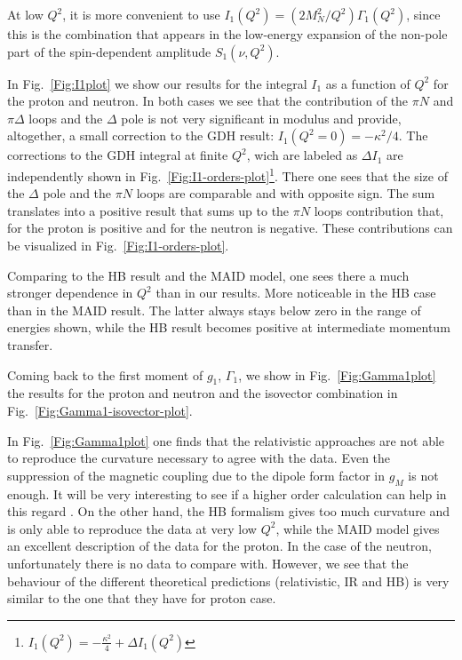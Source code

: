 \documentclass[prc,twocolumn,showpacs,preprintnumbers,amsmath,amssymb
,superscriptaddress,a4paper,nofootinbib
]{revtex4-1}
\begin{document}
At low $Q^2$, it is more convenient to use $I_1(Q^2) = (2M_N^2/Q^2)\Gamma_1(Q^2)$, since this is the combination that appears in the low-energy expansion of the non-pole part of the spin-dependent amplitude $S_1(\nu, Q^2)$.

In Fig.~\ref{Fig:I1plot} we show our results for the integral $I_1$ as a function of $Q^2$ for the proton and neutron.
In both cases we see that the contribution of the $\pi N$ and $\pi \Delta$ loops and the $\Delta$ pole is not very significant in modulus and provide, altogether, a small correction to the GDH result: $I_1(Q^2=0)=-\kappa^2/4$.
The corrections to the GDH integral at finite $Q^2$, wich are labeled as $\Delta I_1$ are independently shown in Fig.~\ref{Fig:I1-orders-plot}\footnote{$I_1(Q^2)= -\frac{\kappa^2}{4} + \Delta I_1(Q^2)$}.
There one sees that the size of the $\Delta$ pole and the $\pi N$ loops are comparable and with opposite sign. 
The sum translates into a positive result that sums up to the $\pi N$ loops contribution that, for the proton is positive and for the neutron is negative. 
These contributions can be visualized in Fig.~\ref{Fig:I1-orders-plot}.

Comparing to the HB result and the MAID model, one sees there a much stronger dependence in $Q^2$ than in our results.
More noticeable in the HB case than in the MAID result. 
The latter always stays below zero in the range of energies shown, while the HB result becomes positive at intermediate momentum transfer.




Coming back to the first moment of $g_1$, $\Gamma_1$, we show in Fig.~\ref{Fig:Gamma1plot} the results for the proton and neutron and the isovector combination in Fig.~\ref{Fig:Gamma1-isovector-plot}. 

In Fig.~\ref{Fig:Gamma1plot} one finds that the relativistic approaches are not able to reproduce the curvature necessary to agree with the data.
Even the suppression of the magnetic coupling due to the dipole form factor in $g_M$ is not enough.
It will be very interesting to see if a higher order calculation can help in this regard \cite{Bernard:2012hb}.
On the other hand, the HB formalism gives too much curvature and is only able to reproduce the data at very low $Q^2$, while the MAID model gives an excellent description of the data for the proton.
In the case of the neutron, unfortunately there is no data to compare with. 
However, we see that the behaviour of the different theoretical predictions (relativistic, IR and HB) is very similar to the one that they have for proton case.
\end{document}

